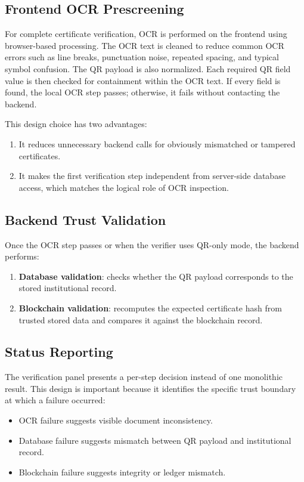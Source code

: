 \documentclass[12pt,a4paper]{article}
\begin{document}
\subsection{Frontend OCR Prescreening}
For complete certificate verification, OCR is performed on the frontend using browser-based processing. The OCR text is cleaned to reduce common OCR errors such as line breaks, punctuation noise, repeated spacing, and typical symbol confusion. The QR payload is also normalized. Each required QR field value is then checked for containment within the OCR text. If every field is found, the local OCR step passes; otherwise, it fails without contacting the backend.

This design choice has two advantages:
\begin{enumerate}[leftmargin=1.5em]
\item It reduces unnecessary backend calls for obviously mismatched or tampered certificates.
\item It makes the first verification step independent from server-side database access, which matches the logical role of OCR inspection.
\end{enumerate}

\subsection{Backend Trust Validation}
Once the OCR step passes or when the verifier uses QR-only mode, the backend performs:
\begin{enumerate}[leftmargin=1.5em]
\item \textbf{Database validation}: checks whether the QR payload corresponds to the stored institutional record.
\item \textbf{Blockchain validation}: recomputes the expected certificate hash from trusted stored data and compares it against the blockchain record.
\end{enumerate}

\subsection{Status Reporting}
The verification panel presents a per-step decision instead of one monolithic result. This design is important because it identifies the specific trust boundary at which a failure occurred:
\begin{itemize}[leftmargin=1.5em]
\item OCR failure suggests visible document inconsistency.
\item Database failure suggests mismatch between QR payload and institutional record.
\item Blockchain failure suggests integrity or ledger mismatch.
\end{itemize}
\end{document}
